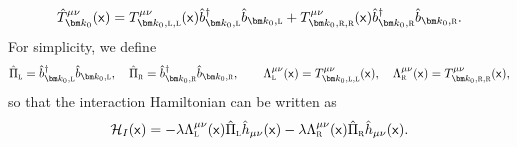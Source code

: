 \documentclass[letterpaper,12pt,titlepage,oneside,final]{book}
\newcommand{\mf}{\mathsf}%
\newcommand{\tc}[1]{\textsc{#1}}
\begin{document}
\begin{equation}
     \hat{T}_{\bm k_0}^{\mu\nu}(\mf x) = T^{\mu\nu}_{\bm k_0,\tc{l},\tc{l}}(\mf x)\hat{b}_{\bm k_0,\tc{l}}^\dagger \hat{b}_{\bm k_0,\tc{l}}+T^{\mu\nu}_{\bm k_0,\tc{r},\tc{r}}(\mf x)\hat{b}_{\bm k_0,\tc{r}}^\dagger \hat{b}_{\bm k_0,\tc{r}}.
\end{equation}
For simplicity, we define
\begin{equation}
    \hat{\Pi}_\tc{l} = \hat{b}_{\bm k_0,\tc{l}}^\dagger \hat{b}_{\bm k_0,\tc{l}}, \quad
    \hat{\Pi}_\tc{r} = \hat{b}_{\bm k_0,\tc{r}}^\dagger \hat{b}_{\bm k_0,\tc{r}}, \quad\quad \Lambda_\tc{l}^{\mu\nu}(\mf x) = T^{\mu\nu}_{\bm k_0,\tc{l},\tc{l}}(\mf x), \quad\Lambda_\tc{r}^{\mu\nu}(\mf x) = T^{\mu\nu}_{\bm k_0,\tc{r},\tc{r}}(\mf x), 
\end{equation}
so that the interaction Hamiltonian can be written as
\begin{equation}\label{eq:BMV1part}
    \mathcal{H}_I(\mf x) = - \lambda \Lambda^{\mu\nu}_\tc{l}(\mf x)\hat{\Pi}_\tc{l}\hat{h}_{\mu\nu}(\mf x) - \lambda \Lambda^{\mu\nu}_\tc{r}(\mf x)\hat{\Pi}_\tc{r}\hat{h}_{\mu\nu}(\mf x).
\end{equation}
\end{document}
